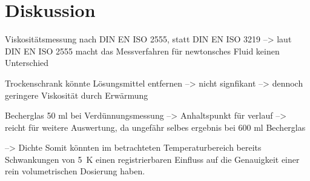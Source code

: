 \section{Diskussion}
\label{sec:diskussion}


Viskositätsmessung nach DIN EN ISO 2555, statt DIN EN ISO 3219 --> laut DIN EN ISO 2555 macht das Messverfahren für newtonsches Fluid keinen Unterschied

Trockenschrank könnte Lösungsmittel entfernen --> nicht signfikant --> dennoch geringere Viskosität durch Erwärmung

Becherglas 50 ml bei Verdünnungsmessung --> Anhaltspunkt für verlauf --> reicht für weitere Auswertung, da ungefähr selbes ergebnis bei 600 ml Becherglas

--> Dichte Somit könnten im betrachteten Temperaturbereich bereits Schwankungen von \SI{5}{\kelvin} einen registrierbaren Einfluss auf die Genauigkeit einer rein volumetrischen Dosierung haben.